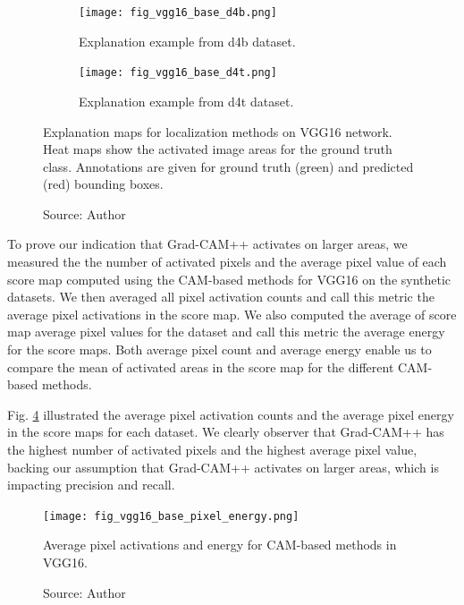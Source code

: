 \begin{figure}[h]
    \begin{center}
    \begin{subfigure}[b]{\textwidth}
         \centering
         \texttt{[image: fig\_vgg16\_base\_d4b.png]}
         \caption{Explanation example from d4b dataset.}
         \label{fig:vgg16_base_explanation_d4b}
    \end{subfigure}
    \begin{subfigure}[b]{\textwidth}
         \centering
         \texttt{[image: fig\_vgg16\_base\_d4t.png]}
         \caption{Explanation example from d4t dataset.}
         \label{fig:vgg16_base_explanation_d4t}
    \end{subfigure}
    \caption[Explanation maps for localization methods on VGG16 network]{Explanation maps for localization methods on VGG16 network. Heat maps show the activated image areas for the ground truth class. Annotations are given for ground truth (green) and predicted (red) bounding boxes.}
    \caption*{Source: Author}
    \label{fig:vgg16_base_explanation}
    \end{center}
\end{figure}

To prove our indication that Grad-CAM++ activates on larger areas, we measured the the number of activated pixels and the average pixel value of each score map computed using the CAM-based methods for VGG16 on the synthetic datasets. We then averaged all pixel activation counts and call this metric the average pixel activations in the score map. We also computed the average of score map average pixel values for the dataset and call this metric the average energy for the score maps. Both average pixel count and average energy enable us to compare the mean of  activated areas in the score map for the different CAM-based methods.

Fig. \ref{fig:vgg16_base_pixel_energy} illustrated the average pixel activation counts and the average pixel energy in the score maps for each dataset. We clearly observer that Grad-CAM++ has the highest number of activated pixels and the highest average pixel value, backing our assumption that Grad-CAM++ activates on larger areas, which is impacting precision and recall.

\begin{figure}[h]
    \begin{center}       
    \texttt{[image: fig\_vgg16\_base\_pixel\_energy.png]}
    \caption[Average pixel activations and energy for CAM-based methods in VGG16]{Average pixel activations and energy for CAM-based methods in VGG16.}
    \caption*{Source: Author}
    \label{fig:vgg16_base_pixel_energy}
    \end{center}
\end{figure}

